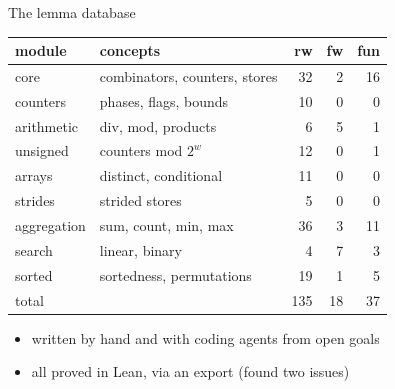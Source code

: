 \documentclass[aspectratio=1610,14pt]{beamer}
\newcommand{\good}[1]{\textcolor{cgreen}{#1}}
\newcommand{\concept}[1]{\textcolor{cblue}{#1}}
\begin{document}
\begin{frame}{The lemma database}
  \begin{center}
  \small
  \setlength{\tabcolsep}{4pt}
  \begin{tabular}{llrrr}
        \toprule
        \textbf{module} & \textbf{concepts} & \textbf{rw} & \textbf{fw} & \textbf{fun} \\
        \midrule
        core        & combinators, counters, stores & 32 & 2 & 16 \\
        counters    & phases, flags, bounds         & 10 & 0 &  0 \\
        arithmetic  & div, mod, products            &  6 & 5 &  1 \\
        unsigned    & counters mod $2^w$            & 12 & 0 &  1 \\
        arrays      & distinct, conditional         & 11 & 0 &  0 \\
        strides     & strided stores                &  5 & 0 &  0 \\
        aggregation & sum, count, min, max          & 36 & 3 & 11 \\
        search      & linear, binary                &  4 & 7 &  3 \\
        sorted      & sortedness, permutations      & 19 & 1 &  5 \\
        \midrule
        total       &                               & 135 & 18 & 37 \\
        \bottomrule
      \end{tabular}
  \end{center}
  \vspace{-0.4em}
  \begin{itemize}
    \item written by hand and with \concept{coding agents} from open goals
    \item \good{all proved in Lean}, via an export (found two issues)
  \end{itemize}
\end{frame}
\end{document}
